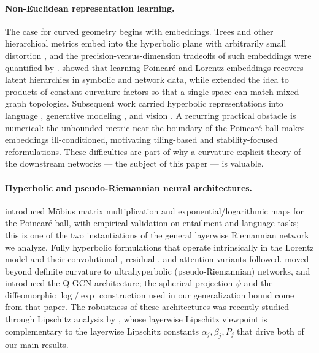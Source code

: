 \documentclass[letterpaper]{article}
\begin{document}
\paragraph{Non-Euclidean representation learning.}
The case for curved geometry begins with embeddings. Trees and other
hierarchical metrics embed into the hyperbolic plane with arbitrarily
small distortion \cite{sarkar2025learning}, and the precision-versus-dimension
tradeoffs of such embeddings were quantified by
\cite{sala2018representation}. \cite{nickel2017poincare, nickel2018learning}
showed that learning Poincar\'e and Lorentz embeddings recovers latent
hierarchies in symbolic and network data, while \cite{gu2018learning}
extended the idea to products of constant-curvature factors so that a
single space can match mixed graph topologies. Subsequent work carried
hyperbolic representations into language \cite{tifrea2018poincar},
generative modeling \cite{mathieu2019continuous, skopek2019mixed}, and
vision \cite{khrulkov2020hyperbolic, atigh2022hyperbolic}. A recurring
practical obstacle is numerical: the unbounded metric near the boundary
of the Poincar\'e ball makes embeddings ill-conditioned, motivating
tiling-based \cite{yu2019numerically} and stability-focused
\cite{mishne2023numerical} reformulations. These difficulties are part of
why a curvature-explicit theory of the downstream networks --- the subject
of this paper --- is valuable.

\paragraph{Hyperbolic and pseudo-Riemannian neural architectures.}
\cite{tifrea2018poincar} introduced M\"obius matrix multiplication and
exponential/logarithmic maps for the Poincar\'e ball, with empirical
validation on entailment and language tasks; this is one of the two
instantiations of the general layerwise Riemannian network we analyze.
Fully hyperbolic formulations that operate intrinsically in the Lorentz
model \cite{chen2022fully} and their convolutional
\cite{bdeir2024fully}, residual \cite{van2023poincare}, and attention
\cite{gulcehre2018hyperbolic} variants followed.
\cite{law2021ultrahyperbolic} moved beyond definite curvature to
ultrahyperbolic (pseudo-Riemannian) networks, and \cite{xiong2022pseudo}
introduced the Q-GCN architecture; the spherical projection $\psi$ and the
diffeomorphic $\log/\exp$ construction used in our generalization bound
come from that paper. The robustness of these architectures was recently
studied through Lipschitz analysis by \cite{li2024improving}, whose
layerwise Lipschitz viewpoint is complementary to the layerwise Lipschitz
constants $\alpha_j, \beta_j, P_j$ that drive both of our main results.
\end{document}
